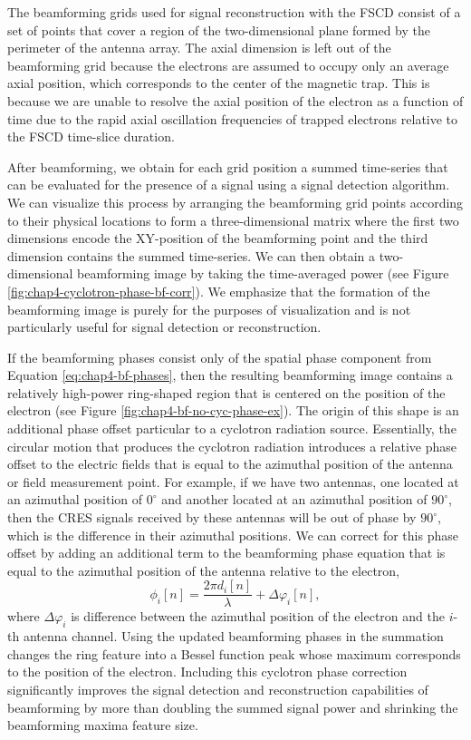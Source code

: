 The beamforming grids used for signal reconstruction with the FSCD consist of a set of points that cover a region of the two-dimensional plane formed by the perimeter of the antenna array. The axial dimension is left out of the beamforming grid because the electrons are assumed to occupy only an average axial position, which corresponds to the center of the magnetic trap. This is because we are unable to resolve the axial position of the electron as a function of time due to the rapid axial oscillation frequencies of trapped electrons relative to the FSCD time-slice duration.

After beamforming, we obtain for each grid position a summed time-series that can be evaluated for the presence of a signal using a signal detection algorithm. We can visualize this process by arranging the beamforming grid points according to their physical locations to form a three-dimensional matrix where the first two dimensions encode the XY-position of the beamforming point and the third dimension contains the summed time-series. We can then obtain a two-dimensional beamforming image by taking the time-averaged power (see Figure \ref{fig:chap4-cyclotron-phase-bf-corr}). We emphasize that the formation of the beamforming image is purely for the purposes of visualization and is not particularly useful for signal detection or reconstruction.

If the beamforming phases consist only of the spatial phase component from Equation \ref{eq:chap4-bf-phases}, then the resulting beamforming image contains a relatively high-power ring-shaped region that is centered on the position of the electron (see Figure \ref{fig:chap4-bf-no-cyc-phase-ex}). The origin of this shape is an additional phase offset particular to a cyclotron radiation source. Essentially, the circular motion that produces the cyclotron radiation introduces a relative phase offset to the electric fields that is equal to the azimuthal position of the antenna or field measurement point. For example, if we have two antennas, one located at an azimuthal position of $0^\circ$ and another located at an azimuthal position of $90^\circ$, then the CRES signals received by these antennas will be out of phase by $90^\circ$, which is the difference in their azimuthal positions. We can correct for this phase offset by adding an additional term to the beamforming phase equation that is equal to the azimuthal position of the antenna relative to the electron, 
\begin{equation}
    \phi_i[n] = \frac{2\pi d_i[n]}{\lambda} + \Delta\varphi_i[n],
\end{equation}
where $\Delta\varphi_i$ is difference between the azimuthal position of the electron and the $i$-th antenna channel. Using the updated beamforming phases in the summation changes the ring feature into a Bessel function peak whose maximum corresponds to the position of the electron. Including this cyclotron phase correction significantly improves the signal detection and reconstruction capabilities of beamforming by more than doubling the summed signal power and shrinking the beamforming maxima feature size. 

